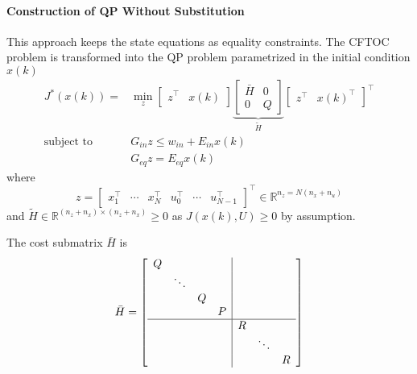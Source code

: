 \paragraph{Construction of QP Without Substitution}\label{cftoc_QP_without_subs}

This approach keeps the state equations as equality constraints. The CFTOC problem is transformed into the QP problem parametrized in the initial condition $x(k)$  %
\begin{align*}
    J^*(x(k)) =            & \min_{z}\begin{bmatrix}
                                         z^\top & x(k)
                                     \end{bmatrix}
    \underbrace{\begin{bmatrix}
                        \bar{H} & 0 \\
                        0       & Q
                    \end{bmatrix}}_{\widetilde{H}}
    \begin{bmatrix}
        z^\top & {x(k)}^\top
    \end{bmatrix}^\top                                       \\
    \text{subject to}\quad & G_{in} z \leq w_{in} +E_{in} x(k) \\
                           & G_{eq} z = E_{eq} x(k)
\end{align*}
where
\begin{equation*}
    z = \begin{bmatrix}
        x_1^\top & \cdots & x_N^\top & u_0^\top & \cdots & u_{N-1}^\top
    \end{bmatrix}^\top \in \mathbb{R}^{n_z = N(n_x + n_u)}
\end{equation*}
and $\widetilde{H}\in \mathbb{R}^{(n_z+n_x) \times (n_z+n_x)} \geq 0$ as $J(x(k),U) \geq 0$ by assumption. %

\newpar{}

The cost submatrix $\bar{H}$ is
\begin{equation*}
    \bar{H} = \left[
        \begin{array}{cccc|cccc} %
            Q &        &   &   &   &        &   \\
              & \ddots &   &   &   &        &   \\
              &        & Q &   &   &        &   \\
              &        &   & P &   &        &   \\
            \hline %
              &        &   &   & R &        &   \\
              &        &   &   &   & \ddots &   \\
              &        &   &   &   &        & R
        \end{array}
        \right]
\end{equation*}

